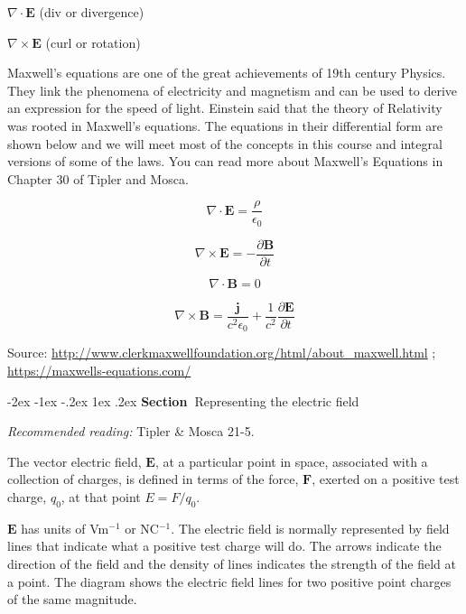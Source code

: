 \documentclass[
]{book}
\makeatletter
\renewcommand\section{%
\@startsection{section}{1}{\z@}%
              {-2ex \@plus -1ex \@minus -.2ex}%
              {1ex \@plus .2ex}%
              {\sffamily\bfseries\large\noindent Section~}}
\numberwithin{equation}{section}
\makeatother
\begin{document}
\(\nabla \cdot \mathbf{E}\) (div or divergence)

\(\nabla \times \mathbf{E}\) (curl or rotation)

Maxwell's equations are one of the great achievements of 19th century
Physics. They link the phenomena of electricity and magnetism and can be
used to derive an expression for the speed of light. Einstein said that
the theory of Relativity was rooted in Maxwell's equations. The
equations in their differential form are shown below and we will meet
most of the concepts in this course and integral versions of some of the
laws. You can read more about Maxwell's Equations in Chapter 30 of
Tipler and Mosca.

\begin{equation}
\label{eq:maxwell1}
\nabla \cdot \mathbf{E} = \frac{\rho}{\epsilon_0}
\end{equation}

\begin{equation}
\label{eq:maxwell2}
\nabla \times \mathbf{E} = - \frac{\partial \mathbf{B}}{\partial t} 
\end{equation}

\begin{equation}
\label{eq:maxwell3}
\nabla \cdot \mathbf{B} = 0
\end{equation}

\begin{equation}
\label{eq:maxwell4}
\nabla \times \mathbf{B} = \frac{\mathbf{j}}{c^2 \epsilon_0} + \frac{1}{c^2} \frac{\partial \mathbf{E}}{\partial t}
\end{equation}

Source: \url{http://www.clerkmaxwellfoundation.org/html/about_maxwell.html}
; \url{https://maxwells-equations.com/}

\hypertarget{representing-the-electric-field}{%
\section{Representing the electric field}\label{representing-the-electric-field}}

\emph{Recommended reading:} Tipler \& Mosca 21-5.

The vector electric field, \(\mathbf{E}\), at a particular point in space,
associated with a collection of charges, is defined in terms of the
force, \(\mathbf{F}\), exerted on a positive test charge, \(q_0\), at that point
\(E = F/q_0\).

\(\mathbf{E}\) has units of Vm\(^{-1}\) or NC\(^{-1}\). The electric field is normally
represented by field lines that indicate what a positive test charge
will do. The arrows indicate the direction of the field and the density
of lines indicates the strength of the field at a point. The diagram
shows the electric field lines for two positive point charges of the
same magnitude.
\end{document}
